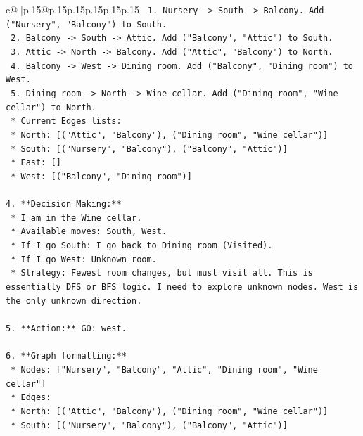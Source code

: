 \documentclass{article}
\begin{document}
{\begin{supertabular}{c@{$\;$}|p{.15\linewidth}@{}p{.15\linewidth}p{.15\linewidth}p{.15\linewidth}p{.15\linewidth}p{.15\linewidth}}
{{{\texttt{            1.  Nursery {-}> South {-}> Balcony. Add ("Nursery", "Balcony") to South.} \\
\texttt{            2.  Balcony {-}> South {-}> Attic. Add ("Balcony", "Attic") to South.} \\
\texttt{            3.  Attic {-}> North {-}> Balcony. Add ("Attic", "Balcony") to North.} \\
\texttt{            4.  Balcony {-}> West {-}> Dining room. Add ("Balcony", "Dining room") to West.} \\
\texttt{            5.  Dining room {-}> North {-}> Wine cellar. Add ("Dining room", "Wine cellar") to North.} \\
\texttt{        *   Current Edges lists:} \\
\texttt{            *   North: {[}("Attic", "Balcony"), ("Dining room", "Wine cellar"){]}} \\
\texttt{            *   South: {[}("Nursery", "Balcony"), ("Balcony", "Attic"){]}} \\
\texttt{            *   East: {[}{]}} \\
\texttt{            *   West: {[}("Balcony", "Dining room"){]}} \\
\\ 
\texttt{4.  **Decision Making:**} \\
\texttt{    *   I am in the Wine cellar.} \\
\texttt{    *   Available moves: South, West.} \\
\texttt{    *   If I go South: I go back to Dining room (Visited).} \\
\texttt{    *   If I go West: Unknown room.} \\
\texttt{    *   Strategy: Fewest room changes, but must visit all. This is essentially DFS or BFS logic. I need to explore unknown nodes. West is the only unknown direction.} \\
\\ 
\texttt{5.  **Action:** GO: west.} \\
\\ 
\texttt{6.  **Graph formatting:**} \\
\texttt{    *   Nodes: {[}"Nursery", "Balcony", "Attic", "Dining room", "Wine cellar"{]}} \\
\texttt{    *   Edges:} \\
\texttt{        *   North: {[}("Attic", "Balcony"), ("Dining room", "Wine cellar"){]}} \\
\texttt{        *   South: {[}("Nursery", "Balcony"), ("Balcony", "Attic"){]}} \\
}}}
\end{supertabular}}
\end{document}

